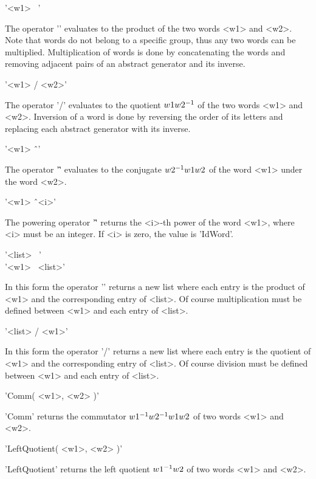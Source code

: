 '<w1> \*\ <w2>'

The  operator  '\*' evaluates  to  the product  of the two words <w1> and
<w2>.  Note that words do not belong to  a  specific  group, thus any two
words   can   be   multiplied.   Multiplication  of   words  is  done  by
concatenating  the  words  and removing adjacent  pairs  of  an  abstract
generator and its inverse.

\vspace{5mm}
'<w1> / <w2>'

The operator '/' evaluates to the quotient $w1\*w2^{-1}$ of the two words
<w1> and <w2>.  Inversion of a word is done by reversing the order of its
letters and replacing each abstract generator with its inverse.

\vspace{5mm}
'<w1> \^\ <w2>'

The operator '\^' evaluates  to the conjugate $w2^{-1}\* w1\* w2$ of  the
word <w1> under the word <w2>.

\vspace{5mm}
'<w1> \^\ <i>'

The powering operator '\^'  returns  the <i>-th power of the  word  <w1>,
where <i> must be an integer.  If <i> is zero, the value is 'IdWord'.

\vspace{5mm}
'<list> \*\ <w1>' \\
'<w1> \*\ <list>'

In this form the operator '\*' returns a new list where each entry is the
product of  <w1>  and  the  corresponding  entry  of <list>.   Of  course
multiplication must be defined between <w1> and each entry of <list>.

\vspace{5mm}
'<list> / <w1>'

In this form the operator '/' returns a new list where  each entry is the
quotient  of  <w1>  and  the  corresponding entry of  <list>.   Of course
division must be defined between <w1> and each entry of <list>.

'Comm( <w1>, <w2> )'

'Comm' returns the commutator $w1^{-1}\* w2^{-1}\* w1\*  w2$ of two words
<w1> and <w2>.

\vspace{5mm}
'LeftQuotient( <w1>, <w2> )'

'LeftQuotient' returns the left quotient $w1^{-1}\* w2$ of two words <w1>
and <w2>.


